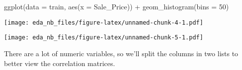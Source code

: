 \documentclass[
]{article}
\newenvironment{Shaded}{\begin{snugshade}}{\end{snugshade}}
\newcommand{\AttributeTok}[1]{\textcolor[rgb]{0.77,0.63,0.00}{#1}}
\newcommand{\DecValTok}[1]{\textcolor[rgb]{0.00,0.00,0.81}{#1}}
\newcommand{\FunctionTok}[1]{\textcolor[rgb]{0.00,0.00,0.00}{#1}}
\newcommand{\NormalTok}[1]{#1}
\newcommand{\OtherTok}[1]{\textcolor[rgb]{0.56,0.35,0.01}{#1}}
\newcommand{\SpecialCharTok}[1]{\textcolor[rgb]{0.00,0.00,0.00}{#1}}
\begin{document}
\begin{Shaded}
\begin{Highlighting}[]
\FunctionTok{ggplot}\NormalTok{(}\AttributeTok{data =}\NormalTok{ train, }\FunctionTok{aes}\NormalTok{(}\AttributeTok{x =}\NormalTok{ Sale\_Price)) }\SpecialCharTok{+}
  \FunctionTok{geom\_histogram}\NormalTok{(}\AttributeTok{bins =} \DecValTok{50}\NormalTok{)}
\end{Highlighting}
\end{Shaded}

\texttt{[image: eda\_nb\_files/figure-latex/unnamed-chunk-4-1.pdf]}

\begin{Shaded}
\end{Shaded}

\texttt{[image: eda\_nb\_files/figure-latex/unnamed-chunk-5-1.pdf]}

There are a lot of numeric variables, so we'll split the columns in two
lists to better view the correlation matrices.
\end{document}

